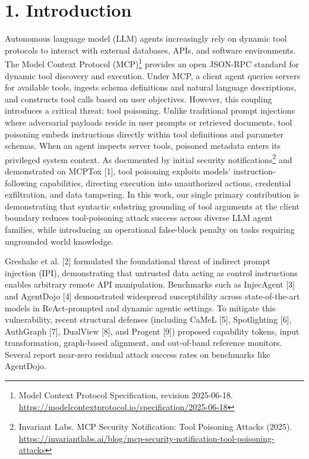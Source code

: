 \documentclass[11pt,letterpaper]{article}
\begin{document}
\section{1. Introduction}

Autonomous language model (LLM) agents increasingly rely on dynamic tool protocols to interact with external databases, APIs, and software environments. The Model Context Protocol (MCP)\footnote{Model Context Protocol Specification, revision 2025-06-18. \url{https://modelcontextprotocol.io/specification/2025-06-18}} provides an open JSON-RPC standard for dynamic tool discovery and execution. Under MCP, a client agent queries servers for available tools, ingests schema definitions and natural language descriptions, and constructs tool calls based on user objectives. However, this coupling introduces a critical threat: tool poisoning. Unlike traditional prompt injections where adversarial payloads reside in user prompts or retrieved documents, tool poisoning embeds instructions directly within tool definitions and parameter schemas. When an agent inspects server tools, poisoned metadata enters its privileged system context. As documented by initial security notifications\footnote{Invariant Labs. MCP Security Notification: Tool Poisoning Attacks (2025). \url{https://invariantlabs.ai/blog/mcp-security-notification-tool-poisoning-attacks}} and demonstrated on MCPTox [1], tool poisoning exploits models' instruction-following capabilities, directing execution into unauthorized actions, credential exfiltration, and data tampering. In this work, our single primary contribution is demonstrating that syntactic substring grounding of tool arguments at the client boundary reduces tool-poisoning attack success across diverse LLM agent families, while introducing an operational false-block penalty on tasks requiring ungrounded world knowledge.

Greshake et al. [2] formulated the foundational threat of indirect prompt injection (IPI), demonstrating that untrusted data acting as control instructions enables arbitrary remote API manipulation. Benchmarks such as InjecAgent [3] and AgentDojo [4] demonstrated widespread susceptibility across state-of-the-art models in ReAct-prompted and dynamic agentic settings. To mitigate this vulnerability, recent structural defenses (including CaMeL [5], Spotlighting [6], AuthGraph [7], DualView [8], and Progent [9]) proposed capability tokens, input transformation, graph-based alignment, and out-of-band reference monitors. Several report near-zero residual attack success rates on benchmarks like AgentDojo.
\end{document}
